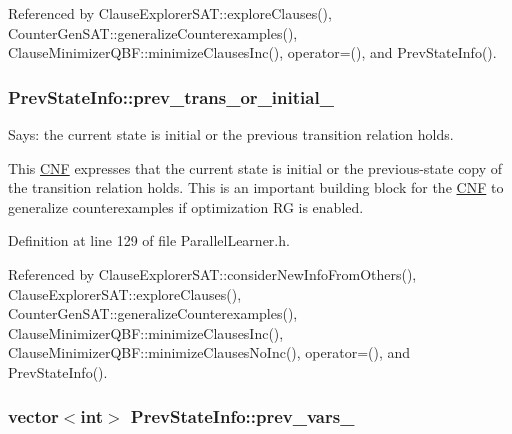Referenced by Clause\-Explorer\-S\-A\-T\-::explore\-Clauses(), Counter\-Gen\-S\-A\-T\-::generalize\-Counterexamples(), Clause\-Minimizer\-Q\-B\-F\-::minimize\-Clauses\-Inc(), operator=(), and Prev\-State\-Info().

\hypertarget{classPrevStateInfo_a3301f7d909263e78ef990173d69f7036}{
\subsubsection[{prev\-\_\-trans\-\_\-or\-\_\-initial\-\_\-}]{ Prev\-State\-Info\-::prev\-\_\-trans\-\_\-or\-\_\-initial\-\_\-}}\label{classPrevStateInfo_a3301f7d909263e78ef990173d69f7036}


Says\-: the current state is initial or the previous transition relation holds. 

This \hyperlink{classCNF}{C\-N\-F} expresses that the current state is initial or the previous-\/state copy of the transition relation holds. This is an important building block for the \hyperlink{classCNF}{C\-N\-F} to generalize counterexamples if optimization R\-G is enabled. 

Definition at line 129 of file Parallel\-Learner.\-h.



Referenced by Clause\-Explorer\-S\-A\-T\-::consider\-New\-Info\-From\-Others(), Clause\-Explorer\-S\-A\-T\-::explore\-Clauses(), Counter\-Gen\-S\-A\-T\-::generalize\-Counterexamples(), Clause\-Minimizer\-Q\-B\-F\-::minimize\-Clauses\-Inc(), Clause\-Minimizer\-Q\-B\-F\-::minimize\-Clauses\-No\-Inc(), operator=(), and Prev\-State\-Info().

\hypertarget{classPrevStateInfo_a90663cf8da8ffe0b834dbde6f8176423}{
\subsubsection[{prev\-\_\-vars\-\_\-}]{\setlength{\rightskip}{0pt plus 5cm}vector$<$int$>$ Prev\-State\-Info\-::prev\-\_\-vars\-\_\-}}\label{classPrevStateInfo_a90663cf8da8ffe0b834dbde6f8176423}


